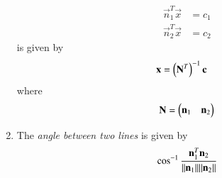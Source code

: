 \begin{enumerate}[label=\arabic*.,ref=\thesubsection.\theenumi]
\begin{align}
\vec{n}_1^T\vec{x} &=c_1
\\
\vec{n}_2^T\vec{x} &=c_2
\end{align}
is given by 
\begin{align}
\mathbf{x} &=\left(\mathbf{N}^T\right)^{-1}\mathbf{c}
\end{align}
where 
\begin{align}
\mathbf{N} = \begin{pmatrix}\mathbf{n}_1 & \mathbf{n}_2\end{pmatrix}
\end{align}
\item The {\em angle between two lines} is given by 
\begin{align}
\cos ^{-1} \frac{\mathbf{n}_1 ^T \mathbf{n}_2}{\lVert\mathbf{n}_1\rVert  \lVert\mathbf{n}_2\rVert}
\end{align}
\end{enumerate}
%
